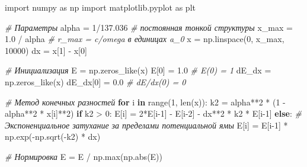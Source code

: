 \documentclass[11pt]{article}
\newenvironment{Shaded}{}{}
\newcommand{\KeywordTok}[1]{\textcolor[rgb]{0.00,0.44,0.13}{\textbf{{#1}}}}
\newcommand{\DecValTok}[1]{\textcolor[rgb]{0.25,0.63,0.44}{{#1}}}
\newcommand{\FloatTok}[1]{\textcolor[rgb]{0.25,0.63,0.44}{{#1}}}
\newcommand{\CommentTok}[1]{\textcolor[rgb]{0.38,0.63,0.69}{\textit{{#1}}}}
\newcommand{\NormalTok}[1]{{#1}}
\newcommand{\ImportTok}[1]{{#1}}
\newcommand{\ControlFlowTok}[1]{\textcolor[rgb]{0.00,0.44,0.13}{\textbf{{#1}}}}
\newcommand{\OperatorTok}[1]{\textcolor[rgb]{0.40,0.40,0.40}{{#1}}}
\newcommand{\BuiltInTok}[1]{{#1}}
\begin{document}
\begin{Shaded}
\begin{Highlighting}[]
\ImportTok{import}\NormalTok{ numpy }\ImportTok{as}\NormalTok{ np}
\ImportTok{import}\NormalTok{ matplotlib.pyplot }\ImportTok{as}\NormalTok{ plt}

\CommentTok{# Параметры}
\NormalTok{alpha }\OperatorTok{=} \DecValTok{1}\OperatorTok{/}\FloatTok{137.036}  \CommentTok{# постоянная тонкой структуры}
\NormalTok{x_max }\OperatorTok{=} \FloatTok{1.0} \OperatorTok{/}\NormalTok{ alpha  }\CommentTok{# r_max = c/omega в единицах a_0}
\NormalTok{x }\OperatorTok{=}\NormalTok{ np.linspace(}\DecValTok{0}\NormalTok{, x_max, }\DecValTok{10000}\NormalTok{)}
\NormalTok{dx }\OperatorTok{=}\NormalTok{ x[}\DecValTok{1}\NormalTok{] }\OperatorTok{-}\NormalTok{ x[}\DecValTok{0}\NormalTok{]}

\CommentTok{# Инициализация}
\NormalTok{E }\OperatorTok{=}\NormalTok{ np.zeros_like(x)}
\NormalTok{E[}\DecValTok{0}\NormalTok{] }\OperatorTok{=} \FloatTok{1.0}  \CommentTok{# E(0) = 1}
\NormalTok{dE_dx }\OperatorTok{=}\NormalTok{ np.zeros_like(x)}
\NormalTok{dE_dx[}\DecValTok{0}\NormalTok{] }\OperatorTok{=} \FloatTok{0.0}  \CommentTok{# dE/dx(0) = 0}

\CommentTok{# Метод конечных разностей}
\ControlFlowTok{for}\NormalTok{ i }\KeywordTok{in} \BuiltInTok{range}\NormalTok{(}\DecValTok{1}\NormalTok{, }\BuiltInTok{len}\NormalTok{(x)):}
\NormalTok{    k2 }\OperatorTok{=}\NormalTok{ alpha}\OperatorTok{**}\DecValTok{2} \OperatorTok{*}\NormalTok{ (}\DecValTok{1} \OperatorTok{-}\NormalTok{ alpha}\OperatorTok{**}\DecValTok{2} \OperatorTok{*}\NormalTok{ x[i]}\OperatorTok{**}\DecValTok{2}\NormalTok{)}
    \ControlFlowTok{if}\NormalTok{ k2 }\OperatorTok{>} \DecValTok{0}\NormalTok{:}
\NormalTok{        E[i] }\OperatorTok{=} \DecValTok{2}\OperatorTok{*}\NormalTok{E[i}\DecValTok{-1}\NormalTok{] }\OperatorTok{-}\NormalTok{ E[i}\DecValTok{-2}\NormalTok{] }\OperatorTok{-}\NormalTok{ dx}\OperatorTok{**}\DecValTok{2} \OperatorTok{*}\NormalTok{ k2 }\OperatorTok{*}\NormalTok{ E[i}\DecValTok{-1}\NormalTok{]}
    \ControlFlowTok{else}\NormalTok{:}
        \CommentTok{# Экспоненциальное затухание за пределами потенциальной ямы}
\NormalTok{        E[i] }\OperatorTok{=}\NormalTok{ E[i}\DecValTok{-1}\NormalTok{] }\OperatorTok{*}\NormalTok{ np.exp(}\OperatorTok{-}\NormalTok{np.sqrt(}\OperatorTok{-}\NormalTok{k2) }\OperatorTok{*}\NormalTok{ dx)}

\CommentTok{# Нормировка}
\NormalTok{E }\OperatorTok{=}\NormalTok{ E }\OperatorTok{/}\NormalTok{ np.}\BuiltInTok{max}\NormalTok{(np.}\BuiltInTok{abs}\NormalTok{(E))}


\end{Highlighting}
\end{Shaded}
\end{document}
